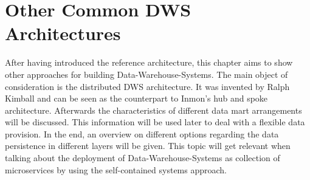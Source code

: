\section{Other Common DWS Architectures}
\label{sec:otherArchitectures}
After having introduced the reference architecture, this chapter aims to show other approaches for building Data-Warehouse-Systems. The main object of consideration is the distributed DWS architecture. It was invented by Ralph Kimball and can be seen as the counterpart to Inmon's hub and spoke architecture.\newline
Afterwards the characteristics of different data mart arrangements will be discussed. This information will be used later to deal with a flexible data provision.\newline
In the end, an overview on different options regarding the data persistence in different layers will be given. This topic will get relevant when talking about the deployment of Data-Warehouse-Systems as collection of microservices by using the self-contained systems approach.

